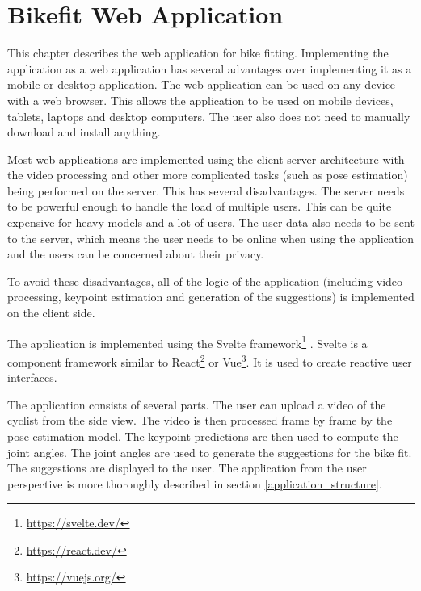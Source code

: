 
\chapter{Bikefit Web Application}
\label{ch:bikefit_application}

This chapter describes the web application for bike fitting. Implementing the application as a web application has several advantages over implementing it as a mobile or desktop application. The web application can be used on any device with a web browser. This allows the application to be used on mobile devices, tablets, laptops and desktop computers. The user also does not need to manually download and install anything.

Most web applications are implemented using the client-server architecture with the video processing and other more complicated tasks (such as pose estimation) being performed on the server. This has several disadvantages. The server needs to be powerful enough to handle the load of multiple users. This can be quite expensive for heavy models and a lot of users. The user data also needs to be sent to the server, which means the user needs to be online when using the application and the users can be concerned about their privacy.

To avoid these disadvantages, all of the logic of the application (including video processing, keypoint estimation and generation of the suggestions) is implemented on the client side.

The application is implemented using the Svelte framework\footnote{\url{https://svelte.dev/}} . Svelte is a component framework similar to React\footnote{\url{https://react.dev/}} or Vue\footnote{\url{https://vuejs.org/}}. It is used to create reactive user interfaces.

The application consists of several parts. The user can upload a video of the cyclist from the side view. The video is then processed frame by frame by the pose estimation model. The keypoint predictions are then used to compute the joint angles. The joint angles are used to generate the suggestions for the bike fit. The suggestions are displayed to the user. The application from the user perspective is more thoroughly described in section \ref{application_structure}.


